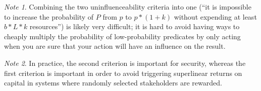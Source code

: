 \documentclass[11pt,a4paper]{article}
\theoremstyle{plain}
\theoremstyle{definition}
\theoremstyle{remark}
\newtheorem*{note}{Note}
\begin{document}
\begin{note}
Combining the two uninfluenceability criteria into one (``it is impossible to increase the probability of $P$ from $p$ to $p * (1 + k)$ without expending at least $b * L * k$ resources'') is likely very difficult; it is hard to avoid having ways to cheaply multiply the probability of low-probability predicates by only acting when you are sure that your action will have an influence on the result. 
\end{note}

\begin{note}
In practice, the second criterion is important for security, whereas the first criterion is important in order to avoid triggering superlinear returns on capital in systems where randomly selected stakeholders are rewarded.
\end{note}
\end{document}
